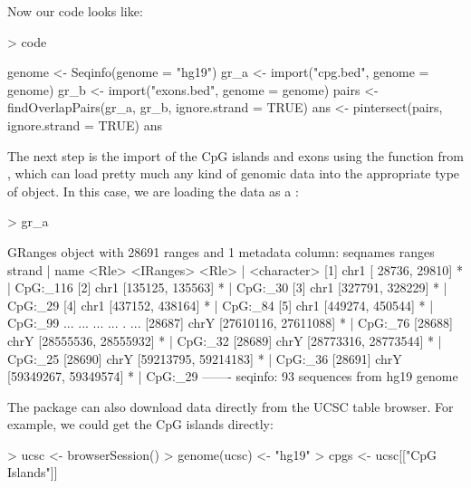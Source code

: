 \documentclass[10pt]{article}
\begin{document}
Now our code looks like:
\begin{Schunk}
\begin{Sinput}
> code
\end{Sinput}
\begin{Soutput}
{
    genome <- Seqinfo(genome = "hg19")
    gr_a <- import("cpg.bed", genome = genome)
    gr_b <- import("exons.bed", genome = genome)
    pairs <- findOverlapPairs(gr_a, gr_b, ignore.strand = TRUE)
    ans <- pintersect(pairs, ignore.strand = TRUE)
    ans
}
\end{Soutput}
\end{Schunk}
The next step is the import of the CpG islands and exons using the
 function from , which can
load pretty much any kind of genomic data into the appropriate
type of \Bioconductor{} object. In this case, we are loading the data
as a :
\begin{Schunk}
\begin{Sinput}
> gr_a
\end{Sinput}
\begin{Soutput}
GRanges object with 28691 ranges and 1 metadata column:
          seqnames               ranges strand |        name
             <Rle>            <IRanges>  <Rle> | <character>
      [1]     chr1     [ 28736,  29810]      * |    CpG:_116
      [2]     chr1     [135125, 135563]      * |     CpG:_30
      [3]     chr1     [327791, 328229]      * |     CpG:_29
      [4]     chr1     [437152, 438164]      * |     CpG:_84
      [5]     chr1     [449274, 450544]      * |     CpG:_99
      ...      ...                  ...    ... .         ...
  [28687]     chrY [27610116, 27611088]      * |     CpG:_76
  [28688]     chrY [28555536, 28555932]      * |     CpG:_32
  [28689]     chrY [28773316, 28773544]      * |     CpG:_25
  [28690]     chrY [59213795, 59214183]      * |     CpG:_36
  [28691]     chrY [59349267, 59349574]      * |     CpG:_29
  -------
  seqinfo: 93 sequences from hg19 genome
\end{Soutput}
\end{Schunk}

The  package can also download data directly from
the UCSC table browser. For example, we could get the CpG islands directly:
\begin{Schunk}
\begin{Sinput}
> ucsc <- browserSession()
> genome(ucsc) <- "hg19"
> cpgs <- ucsc[["CpG Islands"]]
\end{Sinput}
\end{Schunk}
\end{document}
